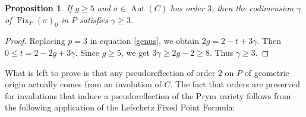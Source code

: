 \documentclass[preprint,12pt]{amsart}
\DeclareMathOperator{\Fix}{Fix}
\theoremstyle{plain}
\newtheorem{proposition}[proposition]{Proposition}
\theoremstyle{definition}
\begin{document}
\begin{proposition}\label{order3}
If $g\geq 5$ and $\sigma\in\operatorname{Aut}(C)$ has order $3$, then the codimension $\gamma$ of $\Fix_P(\sigma)_0$ in $P$ satisfies $\gamma \geq 3$.
\end{proposition}
\begin{proof}
 Replacing $p=3$ in equation \eqref{genus}, we obtain $2g=2-t+3\gamma$.
 Then $0\le t=2-2g+3\gamma$.
 Since $g\ge 5$, we get $3\gamma \ge 2g-2 \ge 8$.
 Thus $\gamma \ge 3$.
\end{proof}


What is left to prove is that any pseudoreflection of order $2$ on $P$ of geometric origin actually comes from an involution of $C$.
The fact that orders are preserved for involutions that induce a pseudoreflection of the Prym variety follows from the following application of the Lefschetz Fixed Point Formula:
\end{document}
